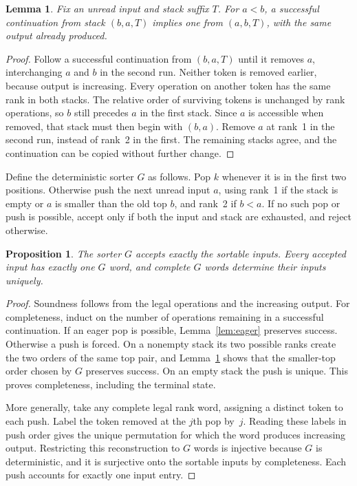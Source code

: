 \documentclass[11pt,a4paper]{article}
\newtheorem{lemma}[theorem]{Lemma}
\newtheorem{proposition}[theorem]{Proposition}
\theoremstyle{remark}
\begin{document}
\begin{lemma}\label{lem:pair}
Fix an unread input and stack suffix $T$. For $a<b$, a successful
continuation from stack $(b,a,T)$ implies one from $(a,b,T)$, with the
same output already produced.
\end{lemma}
\begin{proof}
Follow a successful continuation from $(b,a,T)$ until it removes $a$,
interchanging $a$ and $b$ in the second run. Neither token is removed
earlier, because output is increasing. Every operation on another token
has the same rank in both stacks. The relative order of surviving tokens
is unchanged by rank operations, so $b$ still precedes $a$ in the first
stack. Since $a$ is accessible when removed, that stack must then begin
with $(b,a)$. Remove $a$ at rank~1 in the second run, instead of rank~2
in the first. The remaining stacks agree, and the continuation can be
copied without further change.
\end{proof}

Define the deterministic sorter $G$ as follows. Pop $k$ whenever it is
in the first two positions. Otherwise push the next unread input $a$,
using rank~1 if the stack is empty or $a$ is smaller than the old top $b$,
and rank~2 if $b<a$. If no such pop or push is possible, accept only if
both the input and stack are exhausted, and reject otherwise.

\begin{proposition}\label{prop:canonical}
The sorter $G$ accepts exactly the sortable inputs. Every accepted input
has exactly one $G$ word, and complete $G$ words determine their inputs
uniquely.
\end{proposition}
\begin{proof}
Soundness follows from the legal operations and the increasing output.
For completeness, induct on the number of operations remaining in a
successful continuation. If an eager pop is possible, Lemma~\ref{lem:eager}
preserves success. Otherwise a push is forced. On a nonempty stack its
two possible ranks create the two orders of the same top pair, and
Lemma~\ref{lem:pair} shows that the smaller-top order chosen by $G$
preserves success. On an empty stack the push is unique. This proves
completeness, including the terminal state.

More generally, take any complete legal rank word, assigning a distinct
token to each push. Label the token removed at the $j$th pop by~$j$.
Reading these labels in push order gives the unique permutation for which
the word produces increasing output. Restricting this reconstruction to
$G$ words is injective because $G$ is deterministic, and it is surjective
onto the sortable inputs by completeness. Each push accounts for exactly
one input entry.
\end{proof}
\end{document}
